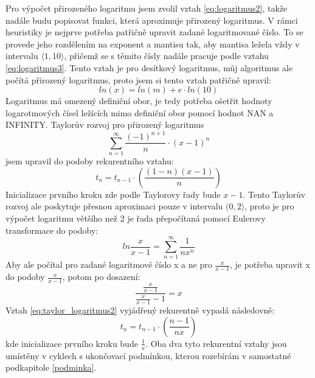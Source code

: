 \documentclass[12pt,a4paper,titlepage,final]{article}
\begin{document}
Pro výpočet přirozeného logaritmu jsem zvolil vztah \ref{eq:logaritmus2},
takže nadále budu popisovat funkci, která aproximuje přirozený logaritmus.
V rámci heuristiky je nejprve potřeba patřičně upravit zadané
logaritmované číslo. To se provede jeho rozdělením na exponent a mantisu tak,
aby mantisa ležela vždy v intervalu $\langle1,10\rangle$,
přičemž se s těmito čísly nadále pracuje podle vztahu \ref{eq:logaritmus3}.
Tento vztah je pro desítkový logaritmus, můj algoritmus ale počítá přirozený
logaritmus, proto jsem si tento vztah patřičně upravil:
\begin{equation}\label{eq:taylor_logaritmus}
ln(x)=ln(m)+e\cdot ln(10)
\end{equation}
Logaritmus má omezený definiční obor, je tedy potřeba ošetřit hodnoty
logarotmových čísel ležících mimo definiční obor pomocí hodnot NAN a INFINITY.
Taylorův rozvoj pro přirozený logaritmus
\begin{equation}\label{eq:taylor_logaritmus}
\sum_{n=1}^{\infty }\frac{(-1)^{n+1}}{n}\cdot (x-1)^{n}
\end{equation}
jsem upravil do podoby rekurentního vztahu:
\begin{equation}\label{eq:rekus_logaritmus}
t_{n}=t_{n-1}\cdot (\frac{(1-n)(x-1)}{n})
\end{equation}
Inicializace prvního kroku zde podle Taylorovy řady bude $x-1$. Tento Taylorův
rozvoj ale poskytuje přesnou aproximaci pouze v intervalu $(0,2\rangle$, proto
je pro výpočet logaritmu většího než 2 je řada přepočítaná pomocí Eulerovy
transformace do podoby:
\begin{equation}\label{eq:taylor_logaritmus2}
ln\frac{x}{x-1}=\sum_{n=1}^{\infty }\frac{1}{nx^{n}}
\end{equation}
Aby ale počítal pro zadané logaritmové číslo x a ne pro $\frac{x}{x-1}$, 
je potřeba upravit x do podoby $\frac{x}{x-1}$, potom po dosazení:
\begin{equation}
\frac{\frac{x}{x-1}}{\frac{x}{x-1}-1}=x
\end{equation}
Vztah \ref{eq:taylor_logaritmus2} vyjádřený rekurentně vypadá následovně:
\begin{equation}
t_{n} = t_{n-1}\cdot (\frac{n-1}{nx})
\end{equation}
kde inicializace prvního kroku bude $\frac{1}{x}$. Oba dva tyto rekurentní
vztahy jsou umístěny v cyklech s ukončovací podmínkou, kterou rozebírám v
samostatné podkapitole \ref{podminka}.

\end{document}
